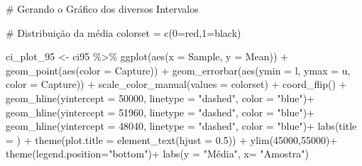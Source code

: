 \documentclass[
  letterpaper,
  DIV=11,
  numbers=noendperiod]{scrartcl}
\newenvironment{Shaded}{\begin{snugshade}}{\end{snugshade}}
\newcommand{\AttributeTok}[1]{\textcolor[rgb]{0.40,0.45,0.13}{#1}}
\newcommand{\CommentTok}[1]{\textcolor[rgb]{0.37,0.37,0.37}{#1}}
\newcommand{\DecValTok}[1]{\textcolor[rgb]{0.68,0.00,0.00}{#1}}
\newcommand{\FloatTok}[1]{\textcolor[rgb]{0.68,0.00,0.00}{#1}}
\newcommand{\FunctionTok}[1]{\textcolor[rgb]{0.28,0.35,0.67}{#1}}
\newcommand{\NormalTok}[1]{\textcolor[rgb]{0.00,0.23,0.31}{#1}}
\newcommand{\OtherTok}[1]{\textcolor[rgb]{0.00,0.23,0.31}{#1}}
\newcommand{\SpecialCharTok}[1]{\textcolor[rgb]{0.37,0.37,0.37}{#1}}
\newcommand{\StringTok}[1]{\textcolor[rgb]{0.13,0.47,0.30}{#1}}
\begin{document}
\begin{Shaded}
\begin{Highlighting}[]
\CommentTok{\# Gerando o Gráfico dos diversos Intervalos}

\CommentTok{\# Distribuição da média}
\NormalTok{colorset }\OtherTok{=} \FunctionTok{c}\NormalTok{(}\StringTok{\textquotesingle{}0\textquotesingle{}}\OtherTok{=}\StringTok{\textquotesingle{}red\textquotesingle{}}\NormalTok{,}\StringTok{\textquotesingle{}1\textquotesingle{}}\OtherTok{=}\StringTok{\textquotesingle{}black\textquotesingle{}}\NormalTok{)}

\NormalTok{ci\_plot\_95 }\OtherTok{\textless{}{-}}\NormalTok{ ci95 }\SpecialCharTok{\%\textgreater{}\%} \FunctionTok{ggplot}\NormalTok{(}\FunctionTok{aes}\NormalTok{(}\AttributeTok{x =}\NormalTok{ Sample, }\AttributeTok{y =}\NormalTok{ Mean)) }\SpecialCharTok{+} 
  \FunctionTok{geom\_point}\NormalTok{(}\FunctionTok{aes}\NormalTok{(}\AttributeTok{color =}\NormalTok{ Capture)) }\SpecialCharTok{+} 
  \FunctionTok{geom\_errorbar}\NormalTok{(}\FunctionTok{aes}\NormalTok{(}\AttributeTok{ymin =}\NormalTok{ l, }\AttributeTok{ymax =}\NormalTok{ u, }\AttributeTok{color =}\NormalTok{ Capture)) }\SpecialCharTok{+}
  \FunctionTok{scale\_color\_manual}\NormalTok{(}\AttributeTok{values =}\NormalTok{ colorset) }\SpecialCharTok{+} \FunctionTok{coord\_flip}\NormalTok{() }\SpecialCharTok{+} 
  \FunctionTok{geom\_hline}\NormalTok{(}\AttributeTok{yintercept =} \DecValTok{50000}\NormalTok{, }\AttributeTok{linetype =} \StringTok{"dashed"}\NormalTok{, }\AttributeTok{color =} \StringTok{"blue"}\NormalTok{)}\SpecialCharTok{+}
  \FunctionTok{geom\_hline}\NormalTok{(}\AttributeTok{yintercept =} \DecValTok{51960}\NormalTok{, }\AttributeTok{linetype =} \StringTok{"dashed"}\NormalTok{, }\AttributeTok{color =} \StringTok{"blue"}\NormalTok{)}\SpecialCharTok{+}
  \FunctionTok{geom\_hline}\NormalTok{(}\AttributeTok{yintercept =} \DecValTok{48040}\NormalTok{, }\AttributeTok{linetype =} \StringTok{"dashed"}\NormalTok{, }\AttributeTok{color =} \StringTok{"blue"}\NormalTok{)}\SpecialCharTok{+} 
  \FunctionTok{labs}\NormalTok{(}\AttributeTok{title =}\NormalTok{ ) }\SpecialCharTok{+} \FunctionTok{theme}\NormalTok{(}\AttributeTok{plot.title =}
  \FunctionTok{element\_text}\NormalTok{(}\AttributeTok{hjust =} \FloatTok{0.5}\NormalTok{)) }\SpecialCharTok{+} \FunctionTok{ylim}\NormalTok{(}\DecValTok{45000}\NormalTok{,}\DecValTok{55000}\NormalTok{)}\SpecialCharTok{+} 
  \FunctionTok{theme}\NormalTok{(}\AttributeTok{legend.position=}\StringTok{"bottom"}\NormalTok{)}\SpecialCharTok{+} \FunctionTok{labs}\NormalTok{(}\AttributeTok{y =} \StringTok{"Média"}\NormalTok{, }\AttributeTok{x=} \StringTok{"Amostra"}\NormalTok{) }


\end{Highlighting}
\end{Shaded}
\end{document}
